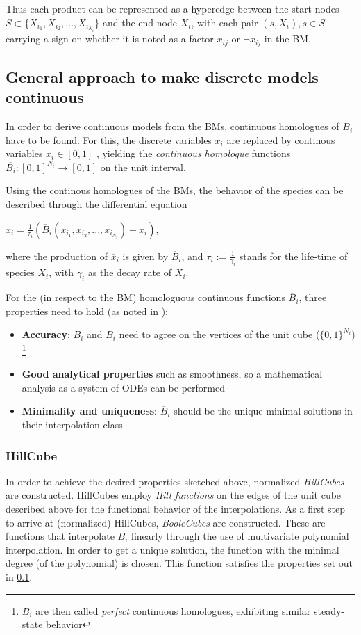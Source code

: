 \documentclass[11pt]{article}
\begin{document}
Thus each product can be represented  as a hyperedge between the start nodes $ S \subset \{X_{i_{1}}, X_{i_{2}},..., X_{i_{N_{i}}}\}$ and the end node $X_{i}$, with each pair $(s, X_{i}), s \in S$ carrying a sign on whether it is noted as a factor $x_{ij}$ or $\neg x_{ij}$ in the BM.

\subsection{General approach to make discrete models continuous} \label{ssec:prop}
In order to derive continuous models from the BMs, continuous homologues of $B_{i}$ have to be found. For this, the discrete variables $x_{i}$ are replaced by continous variables $\overline{x_{i}} \in [0, 1]$ , yielding the \textit{continuous homologue} functions $\overline{B_{i}} : [0, 1]^{N_{i}} \rightarrow [0, 1]$ on the unit interval.

Using the continous homologues of the BMs, the behavior of the species can be described through the differential equation

 $\dot{\overline{x_{i}}} = \frac{1}{\tau_{i}} (\overline{B}_{i} (\overline{x}_{i_{1}}, \overline{x}_{i_{2}},..., \overline{x}_{i_{N_{i}}}) - \overline{x}_{i})$,
 
 where the production of $\overline{x}_{i}$ is given by $\overline{B}_{i}$, and $\tau_{i} := \frac{1}{\gamma_{i}}$ stands for the life-time of species $X_{i}$, with $\gamma_{i}$ as the decay rate of $X_{i}$.

For the (in respect to the BM) homologuous continuous functions $\overline{B}_{i}$, three properties need to hold (as noted in \cite{Wittmann}):
\begin{itemize}
	\item \textbf{Accuracy}: $\overline{B_{i}}$ and $B_{i}$ need to agree on the vertices of the unit cube ($\{0,1\}^{N_{i}})$ \footnote{$\overline{B_{i}}$ are then called \textit{perfect} continuous homologues, exhibiting similar steady-state behavior}
	\item \textbf{Good analytical properties} such as smoothness, so a mathematical analysis as a system of ODEs can be performed
	\item \textbf{Minimality and uniqueness}: $\overline{B}_{i}$ should be the unique minimal solutions in their interpolation class
\end{itemize}

\subsubsection{HillCube}
In order to achieve the desired properties sketched above, normalized \textit{HillCubes} are constructed. HillCubes employ \textit{Hill functions} on the edges of the unit cube described above for the functional behavior of the interpolations.
As a first step to arrive at (normalized) HillCubes, \textit{BooleCubes} are constructed. These are functions that interpolate $B_{i}$ linearly through the use of multivariate polynomial interpolation. In order to get a unique solution,
the function with the minimal degree (of the polynomial) is chosen. This function satisfies the properties set out in \ref{ssec:prop}.
\end{document}
